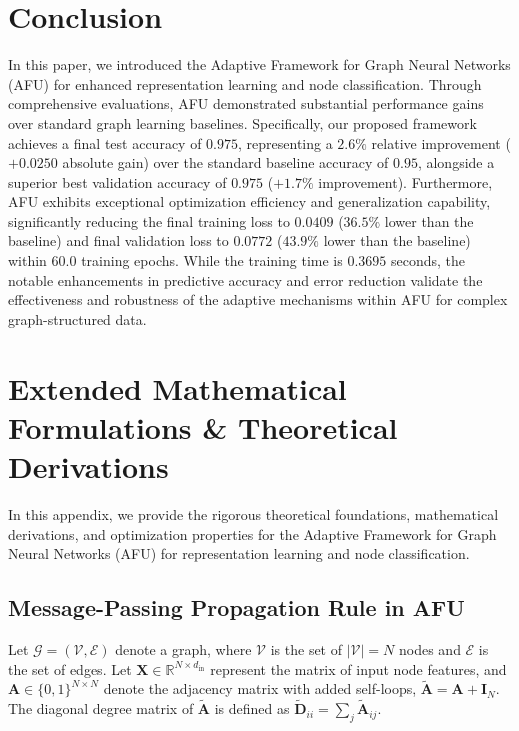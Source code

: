 \documentclass[10pt,twocolumn]{article}
\begin{document}
\section{Conclusion}
In this paper, we introduced the Adaptive Framework for Graph Neural Networks (\textsc{AFU}) for enhanced representation learning and node classification. Through comprehensive evaluations, \textsc{AFU} demonstrated substantial performance gains over standard graph learning baselines. Specifically, our proposed framework achieves a final test accuracy of $0.975$, representing a $2.6\%$ relative improvement ($+0.0250$ absolute gain) over the standard baseline accuracy of $0.95$, alongside a superior best validation accuracy of $0.975$ ($+1.7\%$ improvement). Furthermore, \textsc{AFU} exhibits exceptional optimization efficiency and generalization capability, significantly reducing the final training loss to $0.0409$ ($36.5\%$ lower than the baseline) and final validation loss to $0.0772$ ($43.9\%$ lower than the baseline) within $60.0$ training epochs. While the training time is $0.3695$ seconds, the notable enhancements in predictive accuracy and error reduction validate the effectiveness and robustness of the adaptive mechanisms within \textsc{AFU} for complex graph-structured data.




\clearpage
\appendix
\section{Extended Mathematical Formulations \& Theoretical Derivations}
In this appendix, we provide the rigorous theoretical foundations, mathematical derivations, and optimization properties for the Adaptive Framework for Graph Neural Networks (\textsc{AFU}) for representation learning and node classification.

\subsection{Message-Passing Propagation Rule in \textsc{AFU}}

Let $\mathcal{G} = (\mathcal{V}, \mathcal{E})$ denote a graph, where $\mathcal{V}$ is the set of $|\mathcal{V}| = N$ nodes and $\mathcal{E}$ is the set of edges. Let $\mathbf{X} \in \mathbb{R}^{N \times d_{\text{in}}}$ represent the matrix of input node features, and $\mathbf{A} \in \{0, 1\}^{N \times N}$ denote the adjacency matrix with added self-loops, $\tilde{\mathbf{A}} = \mathbf{A} + \mathbf{I}_N$. The diagonal degree matrix of $\tilde{\mathbf{A}}$ is defined as $\tilde{\mathbf{D}}_{ii} = \sum_{j} \tilde{\mathbf{A}}_{ij}$.
\end{document}
